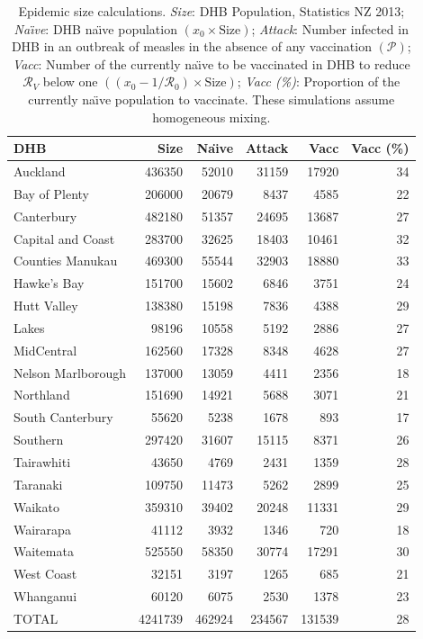 \documentclass{article}
\newcommand{\Pe}{\mathcal{P}}
\newcommand{\Ro}{\mathcal{R}_0}
\newcommand{\Rr}{\mathcal{R}}
\begin{document}
\begin{table}[htdp]\small
\begin{center}
\begin{tabular}{lrrrrr}
\hline
DHB  & Size  & Na\"{\i}ve    &   Attack	& Vacc	& Vacc (\%)	\\
\hline
Auckland	&	436350	&	52010	&	31159	&	17920	& 34\\
Bay of Plenty	&	206000	&	20679	&	8437	&	4585	& 22\\
Canterbury	&	482180	&	51357	&	24695	&	13687	& 27\\
Capital and Coast	&	283700	&	32625	&	18403	&	10461 & 32	\\
Counties Manukau	&	469300	&	55544	&	32903	&	18880	& 33\\
Hawke's Bay	&	151700	&	15602	&	6846	&	3751 & 24\\
Hutt Valley	&	138380	&	15198	&	7836	&	4388	& 29\\
Lakes	&	98196	&	10558	&	5192	&	2886	& 27\\
MidCentral	&	162560	&	17328	&	8348	&	4628	& 27\\
Nelson Marlborough	&	137000	&	13059	&	4411	&	2356	& 18\\
Northland	&	151690	&	14921	&	5688	&	3071	& 21\\
South Canterbury	&	55620	&	5238	&	1678	&	893	& 17\\
Southern	&	297420	&	31607	&	15115	&	8371	& 26\\
Tairawhiti &	43650	&	4769	&	2431	&	1359	& 28\\
Taranaki	&	109750	&	11473	&	5262	&	2899	& 25\\
Waikato	&	359310	&	39402	&	20248	&	11331	& 29\\
Wairarapa	&	41112	&	3932	&	1346	&	720	& 18\\
Waitemata	&	525550	&	58350	&	30774	&	17291	& 30\\
West Coast	&	32151	&	3197	&	1265	&	685	& 21\\
Whanganui	&	60120	&	6075	&	2530	&	1378	& 23\\
\hline			
TOTAL   & 		4241739   & 		462924   & 		234567   & 		131539 & 28\\
\hline
\end{tabular}
\end{center}
\caption{Epidemic size calculations. \textit{Size}: DHB Population, Statistics NZ 2013;		
\textit{Na\"{\i}ve}:		DHB na\"{\i}ve population $\left(x_0\times\text{Size}\right)$;		
\textit{Attack}:		Number infected in DHB in an outbreak of measles in the absence of any vaccination $\left(\Pe\right)$;	
\textit{Vacc}:		Number of the currently na\"{\i}ve to be vaccinated in DHB to reduce $\Rr_V$ below one  $\left(\left(x_0-1/\Ro\right)\times\text{Size}\right)$; \textit{Vacc (\%)}: Proportion of the currently na\"{\i}ve population to vaccinate. These simulations assume homogeneous mixing.			
}
\label{table:attack}
\end{table}%
\end{document}
